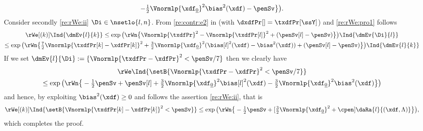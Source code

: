 \begin{pro}
\begin{multline*}
    -\tfrac{1}{2}\Vnormlp{\xdf_{\underline{0}}}^2\bias^2(\xdf)-\penSv\big\}\big).
  \end{multline*}
  Consider secondly \ref{re:rWe:ii} $\Di\in\nsetlo{l,n}$. From \ref{re:contr:e2}
  in  (with $\dxdfPr[]=\txdfPr[\ssY]$) and
  \eqref{re:rWe:pro1} follows
  \begin{multline*}
    \rWe[(k)]\Ind{\dmEv{l}{k}}
    \leq\exp\big(\rWn\big\{\Vnormlp{\txdfPr}^2-\Vnormlp{\txdfPr[l]}^2
    +(\penSv[l]-\penSv)\big\}\big)\Ind{\dmEv{\Di}{l}}\\
    \leq
    \exp\big(\rWn\big\{\tfrac{7}{2}\Vnormlp{\txdfPr[k]-\xdfPr[k]}^2
    +\tfrac{3}{2}\Vnormlp{\xdf_{\underline{0}}}^2(\bias[l]^2(\xdf)-\bias^2(\xdf))
    +(\penSv[l]-\penSv)\big\}\big)\Ind{\dmEv{l}{k}}
  \end{multline*}
  If we set $\dmEv{l}{\Di}:=\{\Vnormlp{\txdfPr-\xdfPr}^2<\penSv/7\}$
  then we clearly have
  \begin{multline*}
    \rWe\Ind{\setB{\Vnormlp{\txdfPr-\xdfPr}^2<\penSv/7}}\\
    \leq \exp\big(\rWn\big\{-\tfrac{1}{2}\penSv+\penSv[l]+
    \tfrac{3}{2}\Vnormlp{\xdf_{\underline{0}}}^2\bias[l]^2(\xdf)
    -\tfrac{3}{2}\Vnormlp{\xdf_{\underline{0}}}^2\bias^2(\xdf)\big\}\big)
  \end{multline*}
  and hence, by exploiting $\bias^2(\xdf)\geq0$ and
   follows the assertion \ref{re:rWe:ii}, that is
  \begin{equation*}
    \rWe[(k)]\Ind{\setB{\Vnormlp{\txdfPr[k]-\xdfPr[k]}^2<\penSv}}
    \leq \exp\big(\rWn\big\{-\tfrac{1}{2}\penSv+[\tfrac{3}{2}\Vnormlp{\xdf_{\underline{0}}}^2+\cpen]\daRa{l}{(\xdf,\Lambda)}\big\}\big),
 \end{equation*}
which completes the proof.\proEnd
\end{pro}
